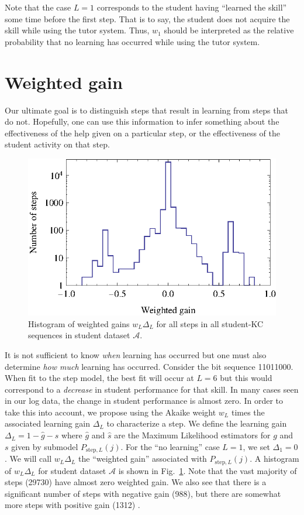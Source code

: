 \documentclass{acmlarge-edm}
\begin{document}
Note that the case $L=1$ corresponds to the student having 
``learned the skill'' some time before the first step.  That is to say, 
the student does not acquire the skill while using the tutor system.
Thus, $w_1$ should be interpreted as the relative probability
that no learning has occurred while using the tutor system.

\section{Weighted gain}

Our ultimate goal is to distinguish steps that result in 
learning from steps that do not.  Hopefully, one can use this
information to infer something about the effectiveness of the help
given on a particular step, or the effectiveness of
the student activity on that step.

\begin{figure}
  \centering \includegraphics{weighted-gain-histogram.eps}
   \caption{Histogram of weighted gains $w_L \Delta_L$ for
     all steps in all student-KC sequences in student dataset $\mathcal{A}$.}
    \label{weighted-gain-histogram}
\end{figure}

It is not sufficient to know {\it when} learning has occurred but one
must also determine {\it how much} learning has occurred.  Consider
the bit sequence 11011000.  When fit to the step model, the best fit
will occur at $L=6$ but this would correspond to a {\it decrease} in student
performance for that skill.  In many cases seen in our log data, 
the change in student performance is almost zero.  In order to take 
this into account,
we propose using the Akaike weight $w_L$ times the associated learning
gain $\Delta_L$ to characterize a step.  We define the learning gain
$\Delta_L=1-\hat{g}-\hat{s}$ where $\hat{g}$ and $\hat{s}$ are the
Maximum Likelihood estimators for $g$ and $s$ given by submodel
$P_{\mathrm{step},L}(j)$.  For the ``no learning'' case $L=1$, we set
$\Delta_1=0$.  We will call $w_L \Delta_L$ the ``weighted gain''
associated with $P_{\mathrm{step},L}(j)$.  A histogram of $w_L
\Delta_L$ for student dataset $\mathcal{A}$ is shown in
Fig.~\ref{weighted-gain-histogram}.  Note that the vast majority of
steps (29730) have almost zero weighted gain.  We also see that there
is a significant number of steps with negative gain (988), but there
are somewhat more steps with positive gain (1312) .
\end{document}
